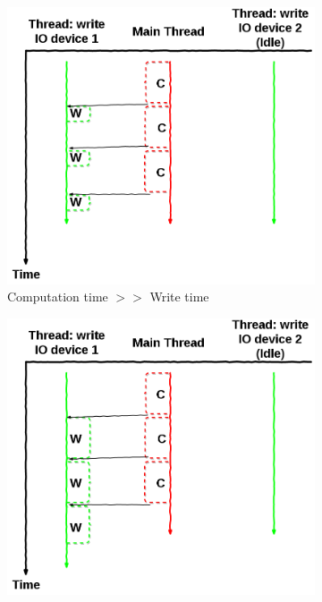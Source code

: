 			\begin{figure}[!h]
				\centering
				\begin{subfigure}[b]{0.475\textwidth}
					\centering
					\includegraphics[width=\textwidth]{charts/internshipJulich_AIO-multipleIoDevice_CBiggerThanW.png}
					\caption[Computation time $>>$ Write time]%
					{{\small Computation time $>>$ Write time}}
					\label{subFig:model0_multipleIoDevice_C>>W}
				\end{subfigure}
				\hfill
				\begin{subfigure}[b]{0.475\textwidth}  
					\centering 
					\includegraphics[width=\textwidth]{charts/internshipJulich_AIO-multipleIoDevice_CEquivalentToW.png}

\end{subfigure}
\end{figure}
